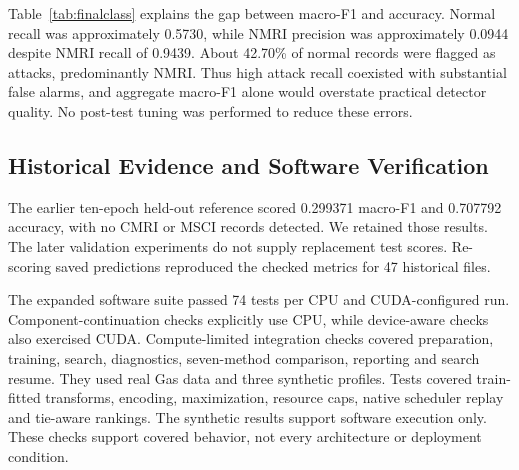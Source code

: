 \begin{table}[!t]\centering\caption{Mean final test class metrics across three training seeds. Support is the fixed test class count.}\label{tab:finalclass}
\end{table}
Table~\ref{tab:finalclass} explains the gap between macro-F1 and accuracy. Normal recall was approximately 0.5730, while NMRI precision was approximately 0.0944 despite NMRI recall of 0.9439. About 42.70\% of normal records were flagged as attacks, predominantly NMRI. Thus high attack recall coexisted with substantial false alarms, and aggregate macro-F1 alone would overstate practical detector quality. No post-test tuning was performed to reduce these errors.






\subsection{Historical Evidence and Software Verification}
The earlier ten-epoch held-out reference scored 0.299371 macro-F1 and 0.707792 accuracy, with no CMRI or MSCI records detected. We retained those results. The later validation experiments do not supply replacement test scores. Re-scoring saved predictions reproduced the checked metrics for 47 historical files.

The expanded software suite passed 74 tests per CPU and CUDA-configured run. Component-continuation checks explicitly use CPU, while device-aware checks also exercised CUDA. Compute-limited integration checks covered preparation, training, search, diagnostics, seven-method comparison, reporting and search resume. They used real Gas data and three synthetic profiles. Tests covered train-fitted transforms, encoding, maximization, resource caps, native scheduler replay and tie-aware rankings. The synthetic results support software execution only. These checks support covered behavior, not every architecture or deployment condition.

